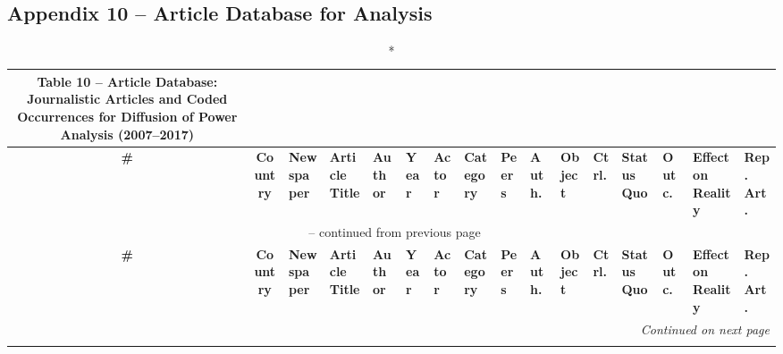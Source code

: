 \clearpage
{}
\begin{landscape}

\section*{Appendix 10 -- Article Database for Analysis}

\vspace{0.3cm}

{\fontsize{5}{6}\selectfont
\begin{longtable}{|c|c|p{1.2cm}|p{2.5cm}|p{1.4cm}|p{1.2cm}|p{1.4cm}|p{1.2cm}|p{1.8cm}|p{0.4cm}|p{1.8cm}|p{0.4cm}|p{1.5cm}|p{0.4cm}|p{0.6cm}|p{0.6cm}|}
\caption*{Table 10 -- Article Database: Journalistic Articles and Coded Occurrences for Diffusion of Power Analysis (2007--2017)} \label{tab:appendix10} \\
\hline
\textbf{\#} & \textbf{Coun\-try} & \textbf{News\-paper} & \textbf{Article Title} & \textbf{Au\-thor} & \textbf{Year} & \textbf{Actor} & \textbf{Cate\-gory} & \textbf{Peers} & \textbf{Auth.} & \textbf{Object} & \textbf{Ctrl.} & \textbf{Status Quo} & \textbf{Outc.} & \textbf{Effect on Reality} & \textbf{Rep. Art.} \\
\hline
\endfirsthead

\multicolumn{16}{c}{\small\tablename\ -- continued from previous page} \\
\hline
\textbf{\#} & \textbf{Coun\-try} & \textbf{News\-paper} & \textbf{Article Title} & \textbf{Au\-thor} & \textbf{Year} & \textbf{Actor} & \textbf{Cate\-gory} & \textbf{Peers} & \textbf{Auth.} & \textbf{Object} & \textbf{Ctrl.} & \textbf{Status Quo} & \textbf{Outc.} & \textbf{Effect on Reality} & \textbf{Rep. Art.} \\
\hline
\endhead

\hline
\multicolumn{16}{r}{\textit{Continued on next page}} \\
\endfoot

\hline
\endlastfoot


\end{longtable}}
\end{landscape}
